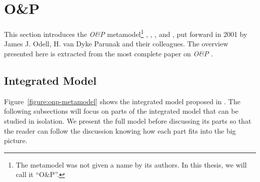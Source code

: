 
\section{O\&P}

This section introduces the \textit{O\&P} metamodel\footnote{The metamodel was not given a name by its authors. In this thesis, we will call it ``O\&P''.} \cite{Odell01}, \cite{Parunak02}, \cite{Odell03b}, \cite{Odell04b} and \cite{Odell05}, put forward in 2001 by James J. Odell, H. van Dyke Parunak and their colleagues.
The overview presented here is extracted from the most complete paper on \textit{O\&P} \cite{Odell05}.


\subsection{Integrated Model}

Figure~\ref{figure:onp-metamodel} shows the integrated model proposed in \cite{Odell05}.
The following subsections will focus on parts of the integrated model that can be studied in isolation.
We present the full model before discussing its parts so that the reader can follow the discussion knowing how each part fits into the big picture.

